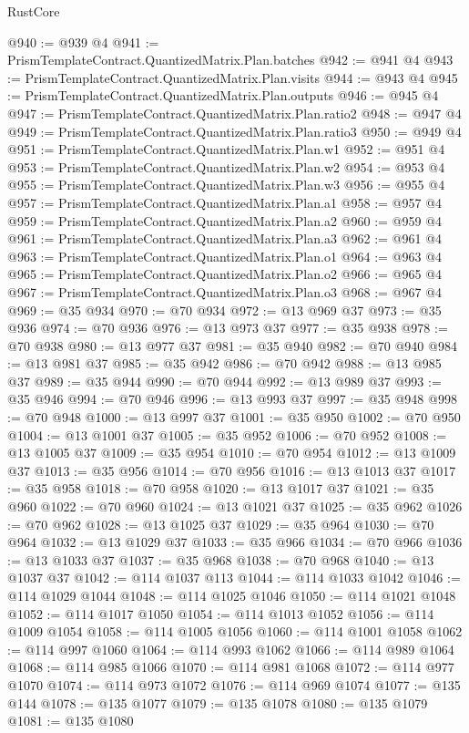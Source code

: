 \begin{lexlean}{RustCore}
\begin{coremodule}
@940 := @939 @4
@941 := PrismTemplateContract.QuantizedMatrix.Plan.batches
@942 := @941 @4
@943 := PrismTemplateContract.QuantizedMatrix.Plan.visits
@944 := @943 @4
@945 := PrismTemplateContract.QuantizedMatrix.Plan.outputs
@946 := @945 @4
@947 := PrismTemplateContract.QuantizedMatrix.Plan.ratio2
@948 := @947 @4
@949 := PrismTemplateContract.QuantizedMatrix.Plan.ratio3
@950 := @949 @4
@951 := PrismTemplateContract.QuantizedMatrix.Plan.w1
@952 := @951 @4
@953 := PrismTemplateContract.QuantizedMatrix.Plan.w2
@954 := @953 @4
@955 := PrismTemplateContract.QuantizedMatrix.Plan.w3
@956 := @955 @4
@957 := PrismTemplateContract.QuantizedMatrix.Plan.a1
@958 := @957 @4
@959 := PrismTemplateContract.QuantizedMatrix.Plan.a2
@960 := @959 @4
@961 := PrismTemplateContract.QuantizedMatrix.Plan.a3
@962 := @961 @4
@963 := PrismTemplateContract.QuantizedMatrix.Plan.o1
@964 := @963 @4
@965 := PrismTemplateContract.QuantizedMatrix.Plan.o2
@966 := @965 @4
@967 := PrismTemplateContract.QuantizedMatrix.Plan.o3
@968 := @967 @4
@969 := @35 @934
@970 := @70 @934
@972 := @13 @969 @37
@973 := @35 @936
@974 := @70 @936
@976 := @13 @973 @37
@977 := @35 @938
@978 := @70 @938
@980 := @13 @977 @37
@981 := @35 @940
@982 := @70 @940
@984 := @13 @981 @37
@985 := @35 @942
@986 := @70 @942
@988 := @13 @985 @37
@989 := @35 @944
@990 := @70 @944
@992 := @13 @989 @37
@993 := @35 @946
@994 := @70 @946
@996 := @13 @993 @37
@997 := @35 @948
@998 := @70 @948
@1000 := @13 @997 @37
@1001 := @35 @950
@1002 := @70 @950
@1004 := @13 @1001 @37
@1005 := @35 @952
@1006 := @70 @952
@1008 := @13 @1005 @37
@1009 := @35 @954
@1010 := @70 @954
@1012 := @13 @1009 @37
@1013 := @35 @956
@1014 := @70 @956
@1016 := @13 @1013 @37
@1017 := @35 @958
@1018 := @70 @958
@1020 := @13 @1017 @37
@1021 := @35 @960
@1022 := @70 @960
@1024 := @13 @1021 @37
@1025 := @35 @962
@1026 := @70 @962
@1028 := @13 @1025 @37
@1029 := @35 @964
@1030 := @70 @964
@1032 := @13 @1029 @37
@1033 := @35 @966
@1034 := @70 @966
@1036 := @13 @1033 @37
@1037 := @35 @968
@1038 := @70 @968
@1040 := @13 @1037 @37
@1042 := @114 @1037 @113
@1044 := @114 @1033 @1042
@1046 := @114 @1029 @1044
@1048 := @114 @1025 @1046
@1050 := @114 @1021 @1048
@1052 := @114 @1017 @1050
@1054 := @114 @1013 @1052
@1056 := @114 @1009 @1054
@1058 := @114 @1005 @1056
@1060 := @114 @1001 @1058
@1062 := @114 @997 @1060
@1064 := @114 @993 @1062
@1066 := @114 @989 @1064
@1068 := @114 @985 @1066
@1070 := @114 @981 @1068
@1072 := @114 @977 @1070
@1074 := @114 @973 @1072
@1076 := @114 @969 @1074
@1077 := @135 @144
@1078 := @135 @1077
@1079 := @135 @1078
@1080 := @135 @1079
@1081 := @135 @1080

\end{coremodule}
\end{lexlean}
